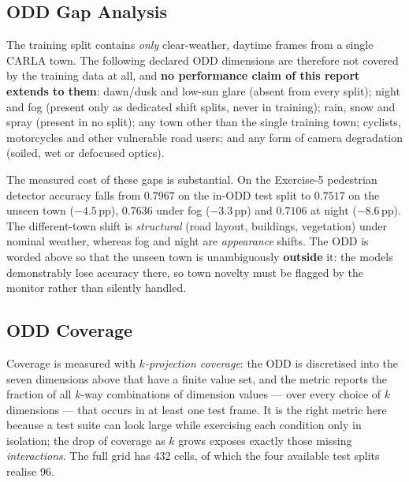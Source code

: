\documentclass[a4paper,12pt]{article}
\begin{document}
\subsection{ODD Gap Analysis}

The training split contains \emph{only} clear-weather, daytime frames from a single CARLA
town. The following declared ODD dimensions are therefore not covered by the training data
at all, and \textbf{no performance claim of this report extends to them}: dawn/dusk and
low-sun glare (absent from every split); night and fog (present only as dedicated shift
splits, never in training); rain, snow and spray (present in no split); any town other
than the single training town; cyclists, motorcycles and other vulnerable road users; and
any form of camera degradation (soiled, wet or defocused optics).

The measured cost of these gaps is substantial. On the Exercise-5 pedestrian detector
accuracy falls from $0.7967$ on the in-ODD test split to $0.7517$ on the unseen town
($-4.5$\,pp), $0.7636$ under fog ($-3.3$\,pp) and $0.7106$ at night ($-8.6$\,pp). The
different-town shift is \emph{structural} (road layout, buildings, vegetation) under
nominal weather, whereas fog and night are \emph{appearance} shifts. The ODD is worded
above so that the unseen town is unambiguously \textbf{outside} it: the models demonstrably
lose accuracy there, so town novelty must be flagged by the monitor rather than silently
handled.

\subsection{ODD Coverage}

Coverage is measured with \emph{$k$-projection coverage}: the ODD is discretised into the
seven dimensions above that have a finite value set, and the metric reports the fraction of
all $k$-way combinations of dimension values --- over every choice of $k$ dimensions ---
that occurs in at least one test frame. It is the right metric here because a test suite can
look large while exercising each condition only in isolation; the drop of coverage as $k$
grows exposes exactly those missing \emph{interactions}. The full grid has 432 cells, of
which the four available test splits realise 96.
\end{document}

